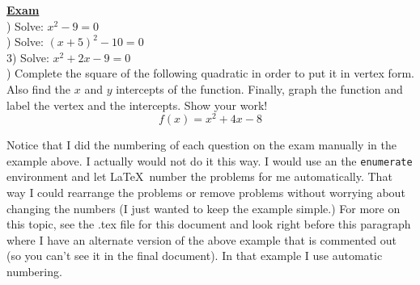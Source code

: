 \documentclass{article}
\begin{document}
\setlength{\columnsep}{5mm}
\setlength{\columnseprule}{.5pt}
\begin{multicols}{2}
\noindent
\underline{\textbf{Exam}}\\
) Solve:  $x^2-9 = 0$\\[2in]
) Solve: $(x+5)^2-10=0$\\[3in]
3) Solve:  $x^2+2x-9=0$\\

\vfill
\columnbreak
{}) Complete the square of the following quadratic in order to put it in vertex form.  
Also find the $x$ and $y$ intercepts of the function.  Finally, graph the function and 
label the vertex and the intercepts. Show your work!
\[
f(x)=x^2+4x-8
\]

\vfill
\pagebreak
\end{multicols}


%
%
Notice that I did the numbering of each question on the exam manually in the example above.  I actually would not do it this way.  I would use an the \texttt{enumerate} environment and let \LaTeX\ number the problems for me automatically.  That way I could rearrange the problems or remove problems without worrying about changing the numbers (I just wanted to keep the example simple.) For more on this topic, see the .tex file for this document and look right before this paragraph where I have an alternate version of the above example that is commented out (so you can't see it in the final document).  In that example I use automatic numbering.  
\end{document}
